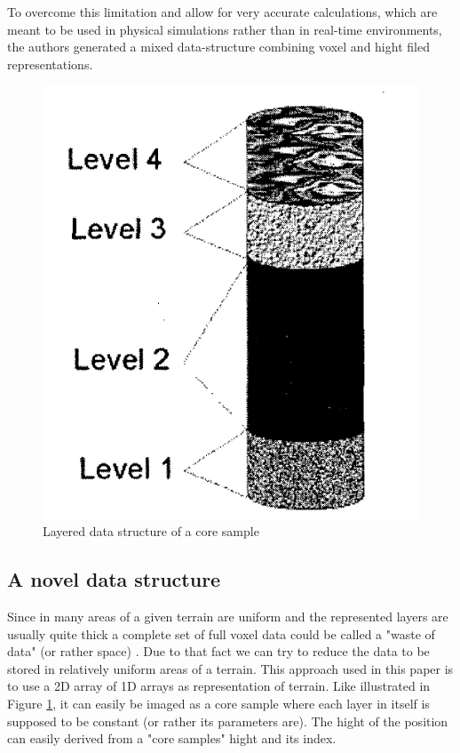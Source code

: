 To overcome this limitation and allow for very accurate calculations, which are meant to be used in physical simulations rather than in real-time environments, the authors generated a mixed data-structure combining voxel and hight filed representations.

\begin{figure}[htb]
	\centering
	\includegraphics[width=\linewidth]{MGG_10/snap1.png}
	\caption{Layered data structure of a core sample}
	\label{fig:coresample}
\end{figure}

\subsection{A novel data structure}
Since in many areas of a given terrain are uniform and the represented layers are usually quite thick a complete set of full voxel data could be called a "waste  of data" (or rather space) \cite{marechal2010heat}. Due to that fact we can try to reduce the data to be stored in relatively uniform areas of a terrain. This approach used in this paper is to use a 2D array of 1D arrays as representation of terrain. Like illustrated in Figure \ref{fig:coresample}, it can easily be imaged as a core sample where each layer in itself is supposed to be constant (or rather its parameters are). The hight of the position can easily derived from a "core samples" hight and its index.


